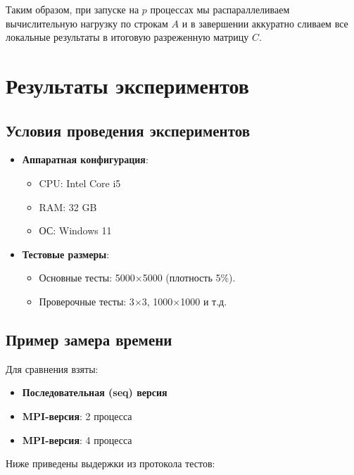\documentclass[12pt]{article}
\begin{document}
Таким образом, при запуске на \(p\) процессах мы распараллеливаем вычислительную нагрузку по строкам \(A\) и в завершении аккуратно сливаем все локальные результаты в итоговую разреженную матрицу \(C\). 


\section{Результаты экспериментов}

\subsection{Условия проведения экспериментов}

\begin{itemize}
    \item \textbf{Аппаратная конфигурация}: 
    \begin{itemize}
        \item CPU: Intel Core i5
        \item RAM: 32 GB
        \item ОС: Windows 11
    \end{itemize}
    \item \textbf{Тестовые размеры}: 
    \begin{itemize}
        \item Основные тесты: 5000$\times$5000 (плотность 5\%).
        \item Проверочные тесты: 3$\times$3, 1000$\times$1000 и т.д.
    \end{itemize}
\end{itemize}

\subsection{Пример замера времени}
Для сравнения взяты:
\begin{itemize}
    \item \textbf{Последовательная (seq) версия}
    \item \textbf{MPI-версия}: 2 процесса
    \item \textbf{MPI-версия}: 4 процесса
\end{itemize}

Ниже приведены выдержки из протокола тестов:
\end{document}
